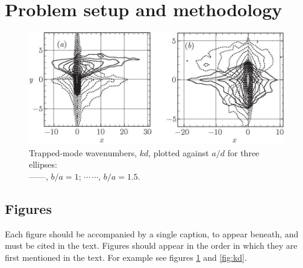 \documentclass[lineno]{jfm}
\begin{document}
\section{Problem setup and methodology}
\label{sec:problem-methodology}

\begin{figure}
  \centerline{\includegraphics{Fig1}}%
  \caption{Trapped-mode wavenumbers, $kd$, plotted against $a/d$ for
    three ellipses:\protect\\
    ---$\!$---,
    $b/a=1$; $\cdots$\,$\cdots$, $b/a=1.5$.}
\label{fig:ka}
\end{figure}

\subsection{Figures}
 Each figure should be accompanied by a single caption, to appear beneath, and must be cited in the text. Figures should appear in the order in which they are first mentioned in the text. For example see figures \ref{fig:ka} and \ref{fig:kd}.
 
\end{document}
